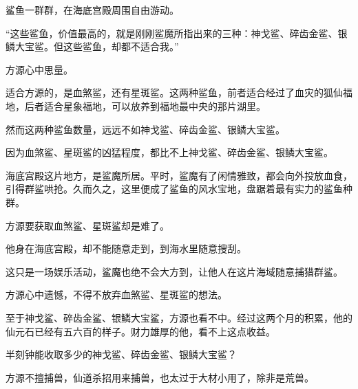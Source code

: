 \begin{this_body}
鲨鱼一群群，在海底宫殿周围自由游动。

“这些鲨鱼，价值最高的，就是刚刚鲨魔所指出来的三种：神戈鲨、碎齿金鲨、银鳞大宝鲨。但这些鲨鱼，却都不适合我。”

方源心中思量。

适合方源的，是血煞鲨，还有星斑鲨。这两种鲨鱼，前者适合经过了血灾的狐仙福地，后者适合星象福地，可以放养到福地最中央的那片湖里。

然而这两种鲨鱼数量，远远不如神戈鲨、碎齿金鲨、银鳞大宝鲨。

因为血煞鲨、星斑鲨的凶猛程度，都比不上神戈鲨、碎齿金鲨、银鳞大宝鲨。

海底宫殿这片地方，是鲨魔所居。平时，鲨魔有了闲情雅致，都会向外投放血食，引得群鲨哄抢。久而久之，这里便成了鲨鱼的风水宝地，盘踞着最有实力的鲨鱼种群。

方源要获取血煞鲨、星斑鲨却是难了。

他身在海底宫殿，却不能随意走到，到海水里随意搜刮。

这只是一场娱乐活动，鲨魔也绝不会大方到，让他人在这片海域随意捕猎群鲨。

方源心中遗憾，不得不放弃血煞鲨、星斑鲨的想法。

至于神戈鲨、碎齿金鲨、银鳞大宝鲨，方源也看不中。经过这两个月的积累，他的仙元石已经有五六百的样子。财力雄厚的他，看不上这点收益。

半刻钟能收取多少的神戈鲨、碎齿金鲨、银鳞大宝鲨？

方源不擅捕兽，仙道杀招用来捕兽，也太过于大材小用了，除非是荒兽。

\end{this_body}


